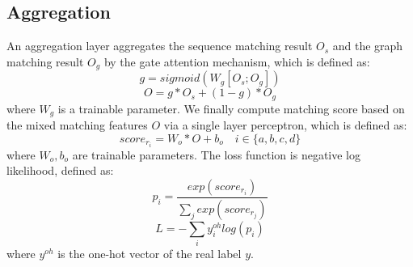 \documentclass[letterpaper]{article}
\begin{document}
\subsection{Aggregation}
An aggregation layer aggregates the sequence matching result $O_s$ and the graph matching result $O_g$ by the gate attention mechanism, which is defined as:
\begin{equation}
    g=sigmoid(W_g [O_s;O_g])
\end{equation}
\begin{equation}
    O=g*O_s + (1-g) * O_g
\end{equation}
where $W_g$ is a trainable parameter. We finally compute matching score based on the mixed matching features $O$ via a single layer perceptron, which is defined as:
\begin{equation}
    score_{r_i}=W_o * O + b_o \quad i \in \{a,b,c,d\}
\end{equation}
where $W_o, b_o$ are trainable parameters. The loss function is negative log likelihood, defined as:
\begin{equation}
    p_i=\frac{exp(score_{r_i})}{\sum_j exp(score_{r_j})}
\end{equation}
\begin{equation}
    L=-\sum_i y_i^{oh} log(p_i)
\end{equation}
where $y^{oh}$ is the one-hot vector of the real label $y$.
\end{document}
